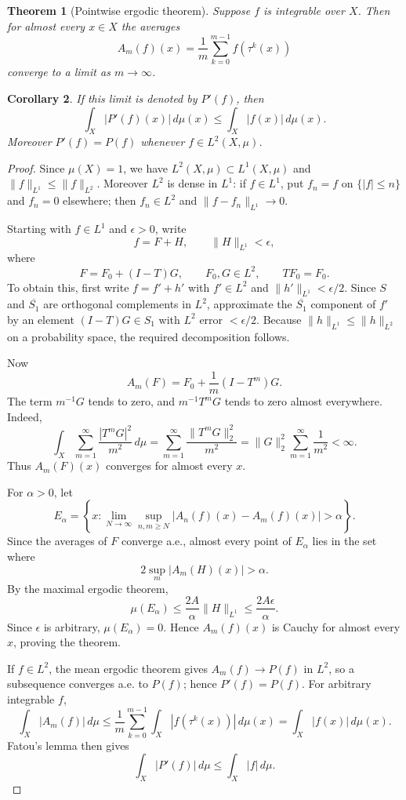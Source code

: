 \documentclass[11pt,openany]{book}
\newtheorem{theorem}{Theorem}[section]
\newtheorem{corollary}[theorem]{Corollary}
\begin{document}
\begin{theorem}[Pointwise ergodic theorem]
Suppose $f$ is integrable over $X$. Then for almost every $x\in X$ the averages
\[
A_m(f)(x)=\frac1m\sum_{k=0}^{m-1}f(\tau^k(x))
\]
converge to a limit as $m\to\infty$.
\end{theorem}

\begin{corollary}
If this limit is denoted by $P'(f)$, then
\[
\int_X|P'(f)(x)|\,d\mu(x)
\leq\int_X|f(x)|\,d\mu(x).
\]
Moreover $P'(f)=P(f)$ whenever $f\in L^2(X,\mu)$.
\end{corollary}

\begin{proof}
Since $\mu(X)=1$, we have $L^2(X,\mu)\subset L^1(X,\mu)$ and $\|f\|_{L^1}\leq\|f\|_{L^2}$. Moreover $L^2$ is dense in $L^1$: if $f\in L^1$, put $f_n=f$ on $\{|f|\leq n\}$ and $f_n=0$ elsewhere; then $f_n\in L^2$ and $\|f-f_n\|_{L^1}\to0$.

Starting with $f\in L^1$ and $\epsilon>0$, write
\[
f=F+H,
\qquad
\|H\|_{L^1}<\epsilon,
\]
where
\[
F=F_0+(I-T)G,
\qquad
F_0,G\in L^2,
\qquad
TF_0=F_0.
\]
To obtain this, first write $f=f'+h'$ with $f'\in L^2$ and $\|h'\|_{L^1}<\epsilon/2$. Since $S$ and $\overline{S_1}$ are orthogonal complements in $L^2$, approximate the $\overline{S_1}$ component of $f'$ by an element $(I-T)G\in S_1$ with $L^2$ error $<\epsilon/2$. Because $\|h\|_{L^1}\leq\|h\|_{L^2}$ on a probability space, the required decomposition follows.

Now
\[
A_m(F)=F_0+\frac1m(I-T^m)G.
\]
The term $m^{-1}G$ tends to zero, and $m^{-1}T^mG$ tends to zero almost everywhere. Indeed,
\[
\int_X\sum_{m=1}^{\infty}\frac{|T^mG|^2}{m^2}\,d\mu
=\sum_{m=1}^{\infty}\frac{\|T^mG\|_2^2}{m^2}
=\|G\|_2^2\sum_{m=1}^{\infty}\frac1{m^2}<\infty.
\]
Thus $A_m(F)(x)$ converges for almost every $x$.

For $\alpha>0$, let
\[
E_\alpha=
\left\{x:\lim_{N\to\infty}\sup_{n,m\geq N}|A_n(f)(x)-A_m(f)(x)|>\alpha\right\}.
\]
Since the averages of $F$ converge a.e., almost every point of $E_\alpha$ lies in the set where
\[
2\sup_m|A_m(H)(x)|>\alpha.
\]
By the maximal ergodic theorem,
\[
\mu(E_\alpha)\leq\frac{2A}{\alpha}\|H\|_{L^1}
\leq\frac{2A\epsilon}{\alpha}.
\]
Since $\epsilon$ is arbitrary, $\mu(E_\alpha)=0$. Hence $A_m(f)(x)$ is Cauchy for almost every $x$, proving the theorem.

If $f\in L^2$, the mean ergodic theorem gives $A_m(f)\to P(f)$ in $L^2$, so a subsequence converges a.e. to $P(f)$; hence $P'(f)=P(f)$. For arbitrary integrable $f$,
\[
\int_X|A_m(f)|\,d\mu
\leq\frac1m\sum_{k=0}^{m-1}\int_X|f(\tau^k(x))|\,d\mu(x)
=\int_X|f(x)|\,d\mu(x).
\]
Fatou's lemma then gives
\[
\int_X|P'(f)|\,d\mu\leq\int_X|f|\,d\mu.
\]
\end{proof}
\end{document}
